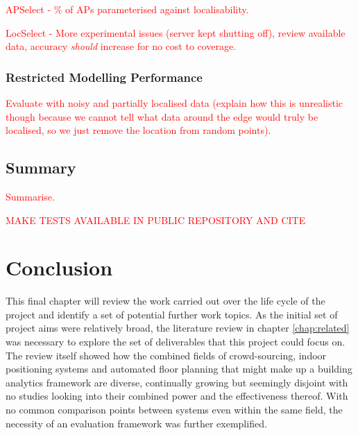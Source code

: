 \documentclass{UoYCSproject}
\begin{document}
                \textcolor{red}{APSelect - \% of APs parameterised against localisability.}
                
                \textcolor{red}{LocSelect - More experimental issues (server kept shutting off), review available data, accuracy \emph{should} increase for no cost to coverage.}
		    
		    \subsection{Restricted Modelling Performance}
            
                \textcolor{red}{Evaluate with noisy and partially localised data (explain how this is unrealistic though because we cannot tell what data around the edge would truly be localised, so we just remove the location from random points).}
        
        \section{Summary}
        
            \textcolor{red}{Summarise.}
            
            \textcolor{red}{MAKE TESTS AVAILABLE IN PUBLIC REPOSITORY AND CITE}
	
	\chapter{Conclusion}
    \label{chap:conclusion}
    
        This final chapter will review the work carried out over the life cycle of the project and identify a set of potential further work topics. As the initial set of project aims were relatively broad, the literature review in chapter \ref{chap:related} was necessary to explore the set of deliverables that this project could focus on. The review itself showed how the combined fields of crowd-sourcing, indoor positioning systems and automated floor planning that might make up a building analytics framework are diverse, continually growing but seemingly disjoint with no studies looking into their combined power and the effectiveness thereof. With no common comparison points between systems even within the same field, the necessity of an evaluation framework was further exemplified.
        
\end{document}
